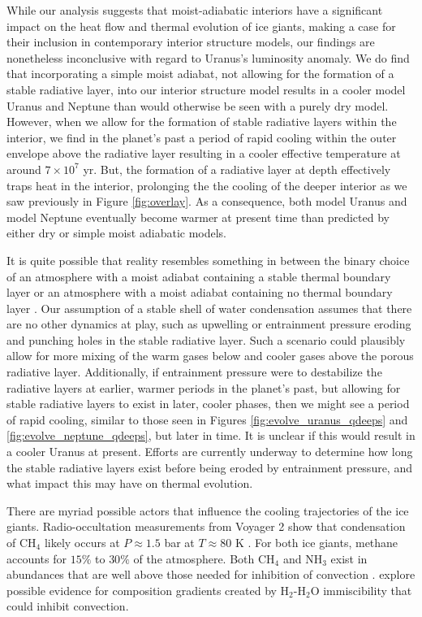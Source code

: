 \documentclass[11pt]{ucscthesisbs}
\begin{document}
While our analysis suggests that moist-adiabatic interiors have a significant impact on the heat flow and thermal evolution of ice giants, making a case for their inclusion in contemporary interior structure models, our findings are nonetheless inconclusive with regard to Uranus's luminosity anomaly. We do find that incorporating a simple moist adiabat, not allowing for the formation of a stable radiative layer, into our interior structure model results in a cooler model Uranus and Neptune than would otherwise be seen with a purely dry model. However, when we allow for the formation of stable radiative layers within the interior, we find in the planet's past a period of rapid cooling within the outer envelope above the radiative layer resulting in a cooler effective temperature at around $7 \times 10^7$ yr. But, the formation of a radiative layer at depth effectively traps heat in the interior, prolonging the the cooling of the deeper interior as we saw previously in Figure \ref{fig:overlay}. As a consequence, both model Uranus and model Neptune eventually become warmer at present time than predicted by either dry or simple moist adiabatic models. 

It is quite possible that reality resembles something in between the binary choice of an atmosphere with a moist adiabat containing a stable thermal boundary layer or an atmosphere with a moist adiabat containing no thermal boundary layer \citep{2019arXiv190802092G}. Our assumption of a stable shell of water condensation assumes that there are no other dynamics at play, such as upwelling or entrainment pressure \citep{friedson_2017,2019arXiv190802092G} eroding and punching holes in the stable radiative layer. Such a scenario could plausibly allow for more mixing of the warm gases below and cooler gases above the porous radiative layer. Additionally, if entrainment pressure were to destabilize the radiative layers at earlier, warmer periods in the planet's past, but allowing for stable radiative layers to exist in later, cooler phases, then we might see a period of rapid cooling, similar to those seen in Figures \ref{fig:evolve_uranus_qdeeps} and \ref{fig:evolve_neptune_qdeeps}, but later in time. It is unclear if this would result in a cooler Uranus at present. Efforts are currently underway to determine how long the stable radiative layers exist before being eroded by entrainment pressure, and what impact this may have on thermal evolution.

There are myriad possible actors that influence the cooling trajectories of the ice giants. Radio-occultation measurements from Voyager 2 show that condensation of CH$_{4}$ likely occurs at $ P \approx  1.5$ bar at $T \approx 80$ K \citep{1992AJ....103..967L}. For both ice giants, methane accounts for $15\%$ to $30 \%$ of the atmosphere. Both CH$_{4}$ and NH$_{3}$ exist in abundances that are well above those needed for inhibition of convection \citep{2019arXiv190802092G}. \citep{2020arXiv201204166B} explore possible evidence for composition gradients created by H$_{2}$-H$_{2}$O immiscibility that could inhibit convection. 
\end{document}

